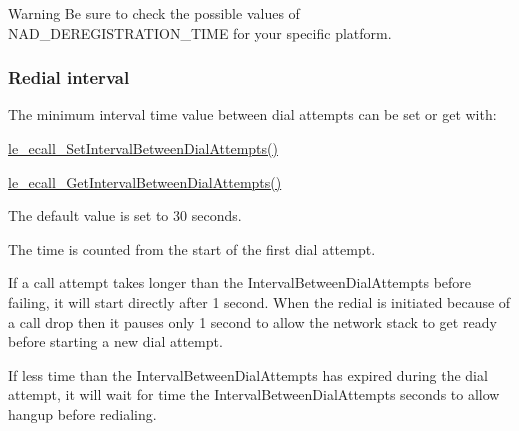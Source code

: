 \begin{DoxyWarning}{Warning}
Be sure to check the possible values of N\+A\+D\+\_\+\+D\+E\+R\+E\+G\+I\+S\+T\+R\+A\+T\+I\+O\+N\+\_\+\+T\+I\+ME for your specific platform.
\end{DoxyWarning}
\hypertarget{c_SDD_eCall_le_ecall_configuration_redialInterval}{}\subsubsection{Redial interval}\label{c_SDD_eCall_le_ecall_configuration_redialInterval}
The minimum interval time value between dial attempts can be set or get with\+:
\begin{DoxyItemize}
\item \hyperlink{le__ecall__interface_8h_af90a8602d4b1d0cacaa3971c508dd188}{le\+\_\+ecall\+\_\+\+Set\+Interval\+Between\+Dial\+Attempts()}
\item \hyperlink{le__ecall__interface_8h_a3a24ae5a007d0c43db2bc55caa43c19d}{le\+\_\+ecall\+\_\+\+Get\+Interval\+Between\+Dial\+Attempts()}
\end{DoxyItemize}


 The default value is set to 30 seconds.

The time is counted from the start of the first dial attempt.

If a call attempt takes longer than the Interval\+Between\+Dial\+Attempts before failing, it will start directly after 1 second. When the redial is initiated because of a call drop then it pauses only 1 second to allow the network stack to get ready before starting a new dial attempt.

If less time than the Interval\+Between\+Dial\+Attempts has expired during the dial attempt, it will wait for time the Interval\+Between\+Dial\+Attempts seconds to allow hangup before redialing.

